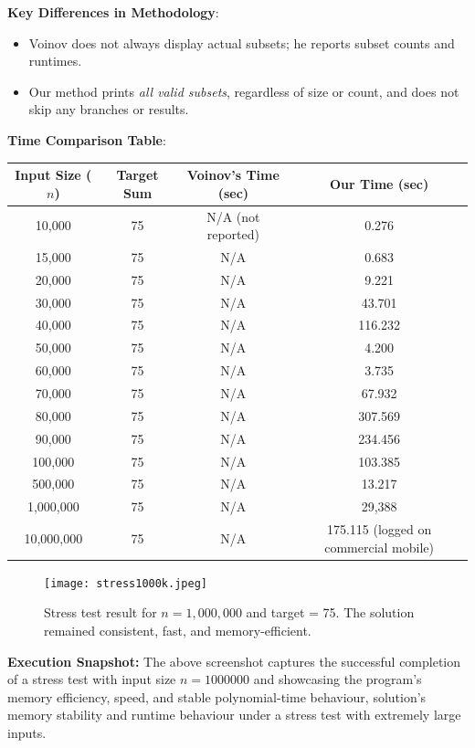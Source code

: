 \documentclass[11pt]{article}
\begin{document}
\vspace{1em}
\noindent\textbf{Key Differences in Methodology}:
\begin{itemize}
    \item Voinov does not always display actual subsets; he reports subset counts and runtimes.
    \item Our method prints \emph{all valid subsets}, regardless of size or count, and does not skip any branches or results.
\end{itemize}

\vspace{10em}
\noindent\textbf{Time Comparison Table}:

\begin{center}
\begin{tabular}{|c|c|c|c|}
\hline
\textbf{Input Size (\(n\))} & \textbf{Target Sum} & \textbf{Voinov’s Time (sec)} & \textbf{Our Time (sec)} \\
\hline
10,000 & 75 & N/A (not reported) & 0.276 \\
\hline
15,000 & 75 & N/A & 0.683 \\
\hline
20,000 & 75 & N/A & 9.221 \\
\hline
30,000 & 75 & N/A & 43.701 \\
\hline
40,000 & 75 & N/A & 116.232 \\
\hline
50,000 & 75 & N/A & 4.200 \\
\hline
60,000 & 75 & N/A & 3.735 \\
\hline
70,000 & 75 & N/A & 67.932 \\
\hline
80,000 & 75 & N/A & 307.569 \\
\hline
90,000 & 75 & N/A & 234.456 \\
\hline
100,000 & 75 & N/A & 103.385 \\
\hline
500,000 & 75 & N/A & 13.217 \\
\hline
1,000,000 & 75 & N/A & 29,388 \\
\hline
10,000,000 & 75 & N/A & 175.115 (logged on commercial mobile) \\
\hline
\end{tabular}
\end{center}
\vspace{1em}

\begin{figure}[H]
  \centering
  \texttt{[image: stress1000k.jpeg]}
  \caption{Stress test result for $n = 1{,}000{,}000$ and target = 75. The solution remained consistent, fast, and memory-efficient.}
  \label{fig:stress1000k}
\end{figure}
\noindent\textbf{Execution Snapshot:} The above screenshot captures the successful completion of a stress test with input size $n = 1000000$ and showcasing the program's memory efficiency, speed, and stable polynomial-time behaviour, solution's memory stability and runtime behaviour under a stress test with extremely large inputs.
\end{document}
